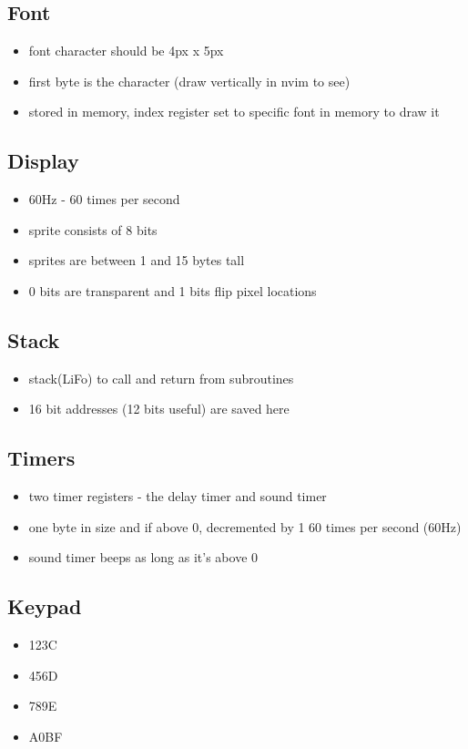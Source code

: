 \documentclass{article}
\begin{document}
\subsection*{Font}
\begin{itemize}
	\item font character should be 4px x 5px
	\item first byte is the character (draw vertically in nvim to see)
	\item stored in memory, index register set to specific font in memory to draw it
\end{itemize}
\subsection*{Display}
\begin{itemize}
	\item 60Hz - 60 times per second
	\item sprite consists of 8 bits
	\item sprites are between 1 and 15 bytes tall
	\item 0 bits are transparent and 1 bits flip pixel locations
\end{itemize}
\subsection*{Stack}
\begin{itemize}
	\item stack(LiFo) to call and return from subroutines
	\item 16 bit addresses (12 bits useful) are saved here
\end{itemize}
\subsection*{Timers}
\begin{itemize}
	\item two timer registers - the delay timer and sound timer
	\item one byte in size and if above 0, decremented by 1 60 times per second (60Hz)
	\item sound timer beeps as long as it's above 0
\end{itemize}
\subsection*{Keypad}
\begin{itemize}
	\item 123C
	\item 456D
	\item 789E
	\item A0BF
\end{itemize}
\end{document}
